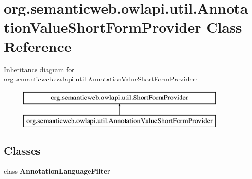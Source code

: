\hypertarget{classorg_1_1semanticweb_1_1owlapi_1_1util_1_1_annotation_value_short_form_provider}{\section{org.\-semanticweb.\-owlapi.\-util.\-Annotation\-Value\-Short\-Form\-Provider Class Reference}
\label{classorg_1_1semanticweb_1_1owlapi_1_1util_1_1_annotation_value_short_form_provider}
}
Inheritance diagram for org.\-semanticweb.\-owlapi.\-util.\-Annotation\-Value\-Short\-Form\-Provider\-:\begin{figure}[H]
\begin{center}
\leavevmode
\includegraphics[height=2.000000cm]{classorg_1_1semanticweb_1_1owlapi_1_1util_1_1_annotation_value_short_form_provider}
\end{center}
\end{figure}
\subsection*{Classes}
\begin{DoxyCompactItemize}
\item 
class {\bfseries Annotation\-Language\-Filter}
\end{DoxyCompactItemize}
